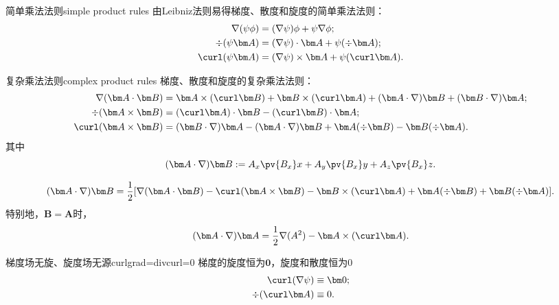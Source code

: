 \begin{theorem}
    {简单乘法法则}{simple product rules}
    由Leibniz法则易得梯度、散度和旋度的简单乘法法则：
    \begin{align}
        \nabla(\psi\phi)&=(\nabla\psi)\phi+\psi\nabla\phi;\\
        \div(\psi\bm A)&=(\nabla\psi)\cdot\bm A+\psi(\div\bm A);\\
        \curl(\psi\bm A)&=(\nabla\psi)\times\bm A+\psi(\curl\bm A).
    \end{align}
\end{theorem}

\begin{theorem}
    {复杂乘法法则}{complex product rules}
    梯度、散度和旋度的复杂乘法法则：
    \begin{align}
        \label{eqn:gradA.B}
        \nabla(\bm A\cdot\bm B)&=\bm A\times(\curl\bm B)+\bm B\times(\curl\bm A)+(\bm A\cdot\nabla)\bm B+(\bm B\cdot\nabla)\bm A;\\
        \label{eqn:divAxB}
        \div(\bm A\times\bm B)&=(\curl\bm A)\cdot\bm B-(\curl\bm B)\cdot\bm A;\\
        \label{eqn:curlAxB}
        \curl(\bm A\times\bm B)&=(\bm B\cdot\nabla)\bm A-(\bm A\cdot\nabla)\bm B+\bm A(\div\bm B)-\bm B(\div\bm A).
    \end{align}
    其中
    \begin{equation}
        (\bm A\cdot\nabla)\bm B:=A_x\pv{B_x}x+A_y\pv{B_x}y+A_z\pv{B_x}z.
    \end{equation}
\end{theorem}

\begin{corollary}
    \begin{equation}
        (\bm A\cdot\nabla)\bm B=\frac12[\nabla(\bm A\cdot\bm B)-\curl(\bm A\times\bm B)-\bm B\times(\curl\bm A)+\bm A(\div\bm B)+\bm B(\div\bm A)].
    \end{equation}
    特别地，$\bm B=\bm A$时，
    \begin{equation}
        (\bm A\cdot\nabla)\bm A=\frac12\nabla(A^2)-\bm A\times(\curl\bm A).
    \end{equation}
\end{corollary}

\begin{theorem}
    {梯度场无旋、旋度场无源}{curlgrad=divcurl=0}
    梯度的旋度恒为$\bm0$，旋度和散度恒为0
    \begin{align}
        \label{eqn:curlgrad}
        \curl(\nabla\psi)&\equiv \bm 0;\\
        \label{eqn:divcurl}
        \div(\curl\bm A)&\equiv 0.
    \end{align}
\end{theorem}

